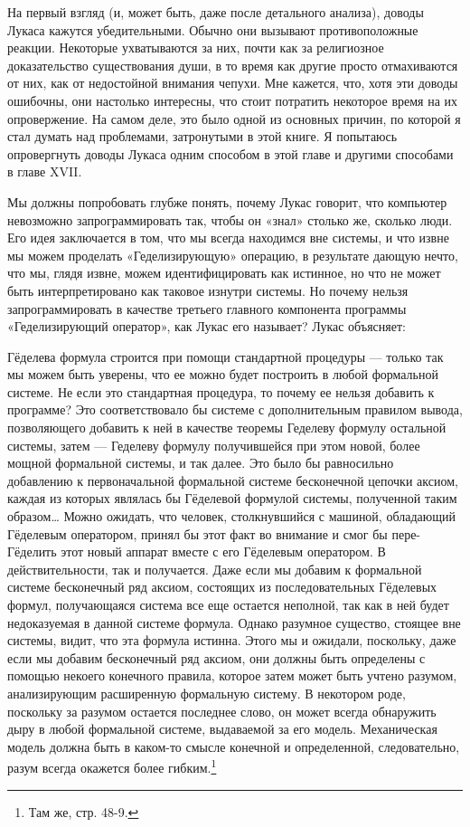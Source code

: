 На первый взгляд (и, может быть, даже после детального анализа), доводы Лукаса кажутся убедительными. Обычно они вызывают противоположные реакции. Некоторые ухватываются за них, почти как за религиозное доказательство существования души, в то время как другие просто отмахиваются от них, как от недостойной внимания чепухи. Мне кажется, что, хотя эти доводы ошибочны, они настолько интересны, что стоит потратить некоторое время на их опровержение. На самом деле, это было одной из основных причин, по которой я стал думать над проблемами, затронутыми в этой книге. Я попытаюсь опровергнуть доводы Лукаса одним способом в этой главе и другими способами в главе XVII.

Мы должны попробовать глубже понять, почему Лукас говорит, что компьютер невозможно запрограммировать так, чтобы он «знал» столько же, сколько люди. Его идея заключается в том, что мы всегда находимся вне системы, и что извне мы можем проделать «Геделизирующую» операцию, в результате дающую нечто, что мы, глядя извне, можем идентифицировать как истинное, но что не может быть интерпретировано как таковое изнутри системы. Но почему нельзя запрограммировать в качестве третьего главного компонента программы «Геделизирующий оператор», как Лукас его называет? Лукас объясняет:

Гёделева формула строится при помощи стандартной процедуры --- только так мы можем быть уверены, что ее можно будет построить в любой формальной системе. Не если это стандартная процедура, то почему ее нельзя добавить к программе? Это соответствовало бы системе с дополнительным правилом вывода, позволяющего добавить к ней в качестве теоремы Геделеву формулу остальной системы, затем --- Геделеву формулу получившейся при этом новой, более мощной формальной системы, и так далее. Это было бы равносильно добавлению к первоначальной формальной системе бесконечной цепочки аксиом, каждая из которых являлась бы Гёделевой формулой системы, полученной таким образом\ldots{} Можно ожидать, что человек, столкнувшийся с машиной, обладающий Гёделевым оператором, принял бы этот факт во внимание и смог бы пере-Гёделить этот новый аппарат вместе с его Гёделевым оператором. В действительности, так и получается. Даже если мы добавим к формальной системе бесконечный ряд аксиом, состоящих из последовательных Гёделевых формул, получающаяся система все еще остается неполной, так как в ней будет недоказуемая в данной системе формула. Однако разумное существо, стоящее вне системы, видит, что эта формула истинна. Этого мы и ожидали, поскольку, даже если мы добавим бесконечный ряд аксиом, они должны быть определены с помощью некоего конечного правила, которое затем может быть учтено разумом, анализирующим расширенную формальную систему. В некотором роде, поскольку за разумом остается последнее слово, он может всегда обнаружить дыру в любой формальной системе, выдаваемой за его модель. Механическая модель должна быть в каком-то смысле конечной и определенной, следовательно, разум всегда окажется более гибким.\footnote{Там же, стр. 48-9.}

